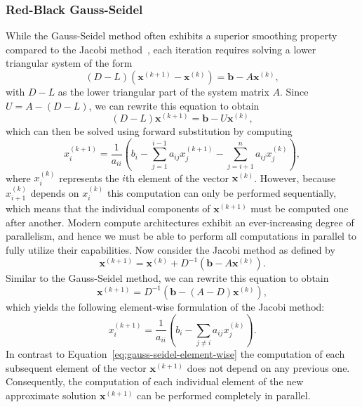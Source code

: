 \subsubsection{Red-Black Gauss-Seidel}
\label{sec:rb-gs}
While the Gauss-Seidel method often exhibits a superior smoothing property compared to the Jacobi method~\cite{briggs2000multigrid,trottenberg2000multigrid}, each iteration requires solving a lower triangular system of the form
\begin{equation*}
	(D - L) (\bm{x}^{(k+1)} - \bm{x}^{(k)}) = \bm{b} - A \bm{x}^{(k)},
\end{equation*}
with $D - L$ as the lower triangular part of the system matrix $A$.
Since $U = A - (D - L)$, we can rewrite this equation to obtain
\begin{equation}
	(D - L) \bm{x}^{(k+1)} = \bm{b} - U \bm{x}^{(k)},
\end{equation}  
which can then be solved using forward substitution by computing
\begin{equation}
	x_{i}^{(k+1)}={\frac {1}{a_{ii}}}\left(b_{i}-\sum _{j=1}^{i-1}a_{ij}x_{j}^{(k+1)}-\sum _{j=i+1}^{n}a_{ij}x_{j}^{(k)}\right),
	\label{eq:gauss-seidel-element-wise}
\end{equation}
where $x_{i}^{(k)}$ represents the $i$th element of the vector $\bm{x}^{(k)}$.
However, because $x_{i+1}^{(k)}$ depends on $x_{i}^{(k)}$ this computation can only be performed sequentially, which means that the individual components of $\bm{x}^{(k+1)}$ must be computed one after another. 
Modern compute architectures exhibit an ever-increasing degree of parallelism, and hence we must be able to perform all computations in parallel to fully utilize their capabilities.
Now consider the Jacobi method as defined by 
\begin{equation*}
	\bm{x}^{(k+1)} = \bm{x}^{(k)} + D^{-1}(\bm b - A \bm{x}^{(k)}).
\end{equation*}
Similar to the Gauss-Seidel method, we can rewrite this equation to obtain
\begin{equation}
	\bm{x}^{(k+1)} = D^{-1}(\bm b - (A - D)\bm{x}^{(k)}),
\end{equation}
which yields the following element-wise formulation of the Jacobi method:
\begin{equation}
x_{i}^{(k+1)}={\frac {1}{a_{ii}}}\left(b_{i}-\sum _{j\neq i}a_{ij}x_{j}^{(k)}\right).
	\label{eq:jacobi-element-wise}
\end{equation}
In contrast to Equation~\eqref{eq:gauss-seidel-element-wise} the computation of each subsequent element of the vector $\bm{x}^{(k+1)}$ does not depend on any previous one.
Consequently, the computation of each individual element of the new approximate solution $\bm{x}^{(k+1)}$ can be performed completely in parallel.

